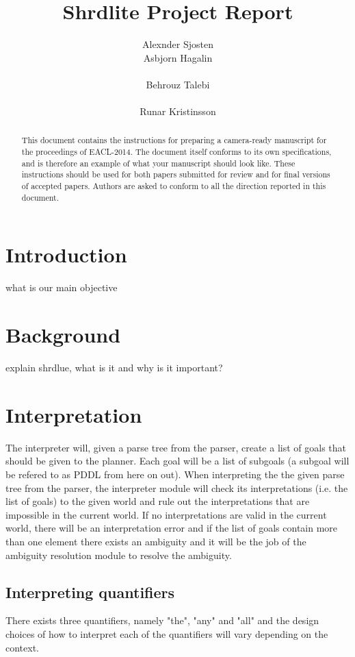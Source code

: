 \documentclass[11pt]{article}
\title{Shrdlite Project Report}
\author{Alexnder Sjosten
  \\\And
  Asbjorn Hagalin \\
  \\\And
  Behrouz Talebi  \\
  \\\And
  Runar Kristinsson \\}
\date{}
\begin{document}
\maketitle
\begin{abstract}
This document contains the instructions for preparing a camera-ready manuscript for the proceedings of EACL-2014. The document itself conforms to its own specifications, and is therefore an example of what your manuscript should look like. These instructions should be used for both papers submitted for review and for final versions of accepted papers. Authors are asked to conform to all the direction reported in this document.
\end{abstract}


\section*{Introduction}
what is our main objective


\section*{Background}
 explain shrdlue, what is it and why is it important?


\section*{Interpretation}
The interpreter will, given a parse tree from the parser, create a list of goals that should be given to the planner. Each goal will be a list of subgoals (a subgoal will be refered to as PDDL from here on out). When interpreting the the given parse tree from the parser, the interpreter module will check its interpretations (i.e. the list of goals) to the given world and rule out the interpretations that are impossible in the current world. If no interpretations are valid in the current world, there will be an interpretation error and if the list of goals contain more than one element there exists an ambiguity and it will be the job of the ambiguity resolution module to resolve the ambiguity.

\subsection*{Interpreting quantifiers}
There exists three quantifiers, namely "the", "any" and "all" and the design choices of how to interpret each of the quantifiers will vary depending on the context.
\end{document}
